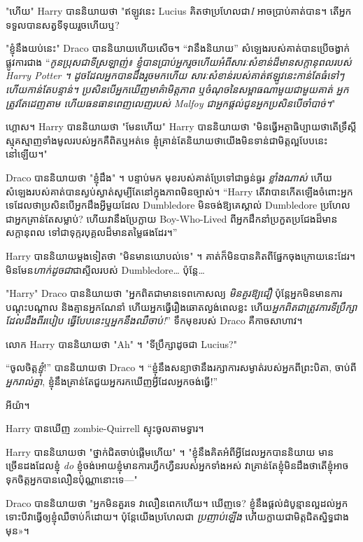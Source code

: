 {{{"ហើយ" Harry បាននិយាយថា "ឥឡូវនេះ Lucius គិតថាប្រហែលជា\emph{I} អាចប្រាប់គាត់បាន។ តើអ្នកទទួលបានសត្វទីទុយរួចហើយឬ?

"ខ្ញុំនឹងយប់នេះ" Draco បាននិយាយហើយសើច។ “វានឹងនិយាយ” សំឡេងរបស់គាត់បានប្រើចង្វាក់ផ្លូវការជាង “\emph{កូនប្រុសជាទីស្រឡាញ់៖ ខ្ញុំបានប្រាប់អ្នករួចហើយអំពីសារៈសំខាន់ដ៏មានសក្តានុពលរបស់ Harry Potter ។ ដូចដែលអ្នកបានដឹងរួចមកហើយ សារៈសំខាន់របស់គាត់ឥឡូវនេះកាន់តែធំទៅៗ ហើយកាន់តែបន្ទាន់។ ប្រសិនបើអ្នកឃើញមាគ៌ាមិត្តភាព ឬចំណុចនៃសម្ពាធណាមួយជាមួយគាត់ អ្នកត្រូវតែដេញតាម ហើយធនធានពេញលេញរបស់ Malfoy ជាអ្នកផ្តល់ជូនអ្នកប្រសិនបើចាំបាច់។}"

ហ្គោស។ Harry បាននិយាយថា "មែនហើយ" Harry បាននិយាយថា "មិនធ្វើអត្ថាធិប្បាយថាតើទ្រឹស្ដីស្មុគស្មាញទាំងមូលរបស់អ្នកគឺពិតឬអត់ទេ ខ្ញុំគ្រាន់តែនិយាយថាយើងមិនទាន់ជាមិត្តល្អបែបនេះនៅឡើយ។"

Draco បាននិយាយថា "ខ្ញុំដឹង" ។ បន្ទាប់មក មុខរបស់គាត់ប្រែទៅជាធ្ងន់ធ្ងរ \emph{ខ្លាំងណាស់} ហើយសំឡេងរបស់គាត់បានស្ងប់ស្ងាត់សូម្បីតែនៅក្នុងភាពមិនច្បាស់។ “Harry តើវាបានកើតឡើងចំពោះអ្នកទេដែលថាប្រសិនបើអ្នកដឹងអ្វីមួយដែល Dumbledore មិនចង់ឱ្យគេស្គាល់ Dumbledore ប្រហែលជាអ្នកគ្រាន់តែសម្លាប់? ហើយវានឹងប្រែក្លាយ Boy-Who-Lived ពីអ្នកដឹកនាំប្រកួតប្រជែងដ៏មានសក្តានុពល ទៅជាទុក្ករបុគ្គលដ៏មានតម្លៃផងដែរ។”

Harry បាននិយាយម្តងទៀតថា "មិនមានយោបល់ទេ" ។ គាត់ក៏មិនបានគិតពីផ្នែកចុងក្រោយនេះដែរ។ មិនមែន\emph{ហាក់ដូចជា}ជាស្ទីលរបស់ Dumbledore… ប៉ុន្តែ…

"Harry" Draco បាននិយាយថា "អ្នកពិតជាមានទេពកោសល្យ \emph{មិនគួរឱ្យជឿ} ប៉ុន្តែអ្នកមិនមានការបណ្តុះបណ្តាល និងគ្មានអ្នកណែនាំ ហើយអ្នកធ្វើរឿងឆោតល្ងង់ពេលខ្លះ ហើយ\emph{អ្នកពិតជាត្រូវការទីប្រឹក្សាដែលដឹងពីរបៀប ធ្វើបែបនេះឬអ្នកនឹងឈឺចាប់!}” ទឹកមុខរបស់ Draco គឺកាចសាហាវ។

លោក Harry បាននិយាយថា "Ah" ។ "ទីប្រឹក្សាដូចជា Lucius?"

“ចូលចិត្ត\emph{ខ្ញុំ}!” បាននិយាយថា Draco ។ “ខ្ញុំ​នឹង​សន្យា​ថា​នឹង​រក្សា​ការ​សម្ងាត់​របស់​អ្នក​ពី​ព្រះបិតា, ចាប់​ពី \emph{អ្នក​រាល់​គ្នា}, ខ្ញុំ​នឹង​គ្រាន់​តែ​ជួយ​អ្នក​រក​ឃើញ​អ្វី​ដែល​អ្នក​ចង់​ធ្វើ!”

អីយ៉ា។

Harry បានឃើញ zombie-Quirrell ស្ទុះចូលតាមទ្វារ។

Harry បាននិយាយថា "ថ្នាក់ជិតចាប់ផ្តើមហើយ" ។ "ខ្ញុំនឹងគិតអំពីអ្វីដែលអ្នកបាននិយាយ មានច្រើនដងដែលខ្ញុំ \emph{do} ខ្ញុំចង់អោយខ្ញុំមានការហ្វឹកហ្វឺនរបស់អ្នកទាំងអស់ វាគ្រាន់តែខ្ញុំមិនដឹងថាតើខ្ញុំអាចទុកចិត្តអ្នកបានលឿនប៉ុណ្ណានោះទេ—"

Draco បាននិយាយថា "អ្នកមិនគួរទេ វាលឿនពេកហើយ។ ឃើញទេ? ខ្ញុំ​នឹង​ផ្តល់​ដំបូន្មាន​ល្អ​ដល់​អ្នក ទោះ​បី​វា​ធ្វើ​ឲ្យ​ខ្ញុំ​ឈឺ​ចាប់​ក៏​ដោយ។ ប៉ុន្តែ​យើង​ប្រហែល​ជា \emph{ប្រញាប់​ឡើង} ហើយ​ក្លាយ​ជា​មិត្ត​ជិតស្និទ្ធ​ជាង​មុន»។

}}}
